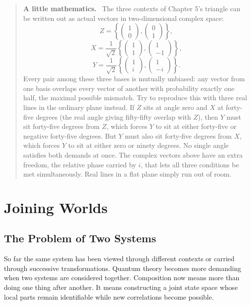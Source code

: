 \documentclass[12pt,openany]{book}
\newenvironment{lowmath}{\begin{quote}\small\noindent\textbf{A little mathematics.}\ }{\end{quote}}
\begin{document}
\begin{lowmath}
The three contexts of Chapter 5's triangle can be written out as actual vectors in two-dimensional complex space:
\[
Z=\left\{\begin{pmatrix}1\\0\end{pmatrix},\begin{pmatrix}0\\1\end{pmatrix}\right\},
\]
\[
X=\frac{1}{\sqrt2}\left\{\begin{pmatrix}1\\1\end{pmatrix},\begin{pmatrix}1\\-1\end{pmatrix}\right\},
\]
\[
Y=\frac{1}{\sqrt2}\left\{\begin{pmatrix}1\\i\end{pmatrix},\begin{pmatrix}1\\-i\end{pmatrix}\right\}.
\]
Every pair among these three bases is mutually unbiased: any vector from one basis overlaps every vector of another with probability exactly one half, the maximal possible mismatch. Try to reproduce this with three real lines in the ordinary plane instead. If $Z$ sits at angle zero and $X$ at forty-five degrees (the real angle giving fifty-fifty overlap with $Z$), then $Y$ must sit forty-five degrees from $Z$, which forces $Y$ to sit at either forty-five or negative forty-five degrees. But $Y$ must also sit forty-five degrees from $X$, which forces $Y$ to sit at either zero or ninety degrees. No single angle satisfies both demands at once. The complex vectors above have an extra freedom, the relative phase carried by $i$, that lets all three conditions be met simultaneously. Real lines in a flat plane simply run out of room.
\end{lowmath}

\part{Joining Worlds}

\chapter{The Problem of Two Systems}
So far the same system has been viewed through different contexts or carried through successive transformations. Quantum theory becomes more demanding when two systems are considered together. Composition now means more than doing one thing after another. It means constructing a joint state space whose local parts remain identifiable while new correlations become possible.
\end{document}
